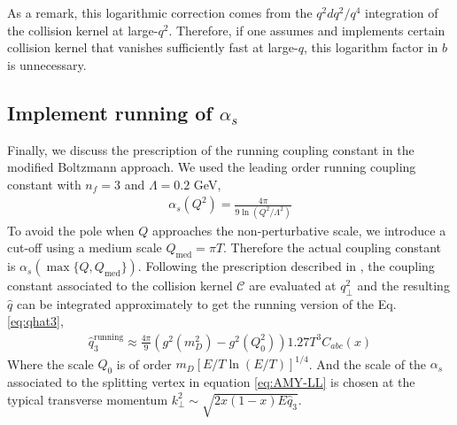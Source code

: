 \documentclass[aps, prc, reprint, amsmath, groupedaddress, nofootinbib]{revtex4-1}
\begin{document}
As a remark, this logarithmic correction comes from the $q^2 dq^2 /q^4$ integration of the collision kernel at large-$q^2$.
Therefore, if one assumes and implements certain collision kernel that vanishes sufficiently fast at large-$q$, this logarithm factor in $b$ is unnecessary. 

\subsection{Implement running of $\alpha_s$}\label{section:running}
Finally, we discuss the prescription of the running coupling constant in the modified Boltzmann approach.
We used the leading order running coupling constant with $n_f = 3$ and $\Lambda = 0.2$ GeV, 
\begin{eqnarray}
\alpha_s(Q^2) = \frac{4\pi}{9\ln\left(Q^2/\Lambda^2\right)}
\end{eqnarray}
To avoid the pole when $Q$ approaches the non-perturbative scale, we introduce a cut-off using a medium scale $Q_{\textrm{med}} = \pi T$. 
Therefore the actual coupling constant is $\alpha_s(\max\{Q, Q_{\textrm{med}}\})$.
Following the prescription described in \cite{Arnold:2008zu}, the coupling constant associated to the collision kernel $\mathcal{C}$ are evaluated at $q_\perp^2$ and the resulting $\hat{q}$ can be integrated approximately to get the running version of the Eq. \ref{eq:qhat3},
\begin{eqnarray}
\hat{q}_3^{\textrm{running}} \approx \frac{4\pi}{9}\left(g^2(m_D^2) - g^2(Q_0^2)\right) 1.27 T^3 C_{abc}(x)
\label{eq:q3running}
\end{eqnarray}
Where the scale $Q_0$ is of order $m_D [E/T \ln(E/T)]^{1/4}$.
And the scale of the $\alpha_s$ associated to the splitting  vertex in equation \ref{eq:AMY-LL} is chosen at the typical transverse momentum $k_\perp^2 \sim \sqrt{2x(1-x)E\hat{q}_3}$.
\end{document}
